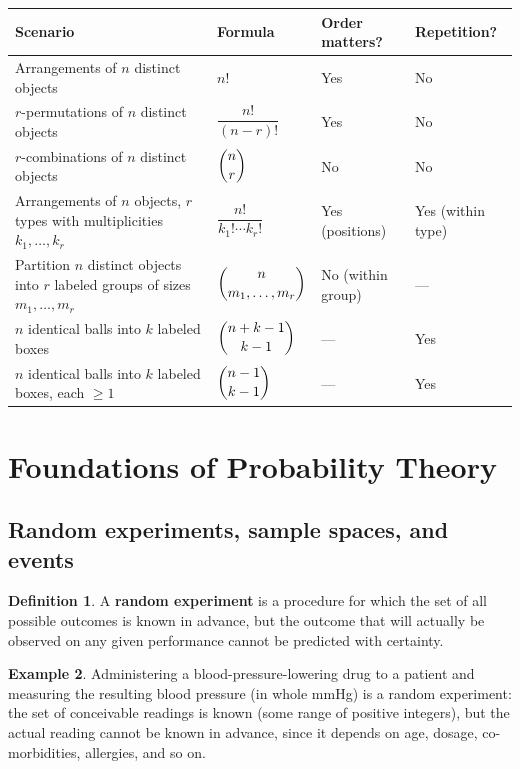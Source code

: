 \documentclass[11pt]{article}
\theoremstyle{definition}
\newtheorem{definition}{Definition}[section]
\newtheorem{example}[definition]{Example}
\theoremstyle{plain}
\theoremstyle{remark}
\begin{document}
\begin{center}
\renewcommand{\arraystretch}{1.5}
\begin{longtable}{p{4.3cm} p{3.7cm} p{2.2cm} p{4.3cm}}
\toprule
\textbf{Scenario} & \textbf{Formula} & \textbf{Order matters?} & \textbf{Repetition?} \\
\midrule
Arrangements of $n$ distinct objects & $n!$ & Yes & No \\
$r$-permutations of $n$ distinct objects & $\dfrac{n!}{(n-r)!}$ & Yes & No \\
$r$-combinations of $n$ distinct objects & $\dbinom{n}{r}$ & No & No \\
Arrangements of $n$ objects, $r$ types with multiplicities $k_1,\dots,k_r$ & $\dfrac{n!}{k_1!\cdots k_r!}$ & Yes (positions) & Yes (within type) \\
Partition $n$ distinct objects into $r$ labeled groups of sizes $m_1,\dots,m_r$ & $\dbinom{n}{m_1,\dots,m_r}$ & No (within group) & --- \\
$n$ identical balls into $k$ labeled boxes & $\dbinom{n+k-1}{k-1}$ & --- & Yes \\
$n$ identical balls into $k$ labeled boxes, each $\ge 1$ & $\dbinom{n-1}{k-1}$ & --- & Yes \\
\bottomrule
\end{longtable}
\end{center}

\newpage
\section{Foundations of Probability Theory}

\subsection{Random experiments, sample spaces, and events}

\begin{definition}
A \textbf{random experiment} is a procedure for which the set of all possible outcomes is known
in advance, but the outcome that will actually be observed on any given performance cannot be
predicted with certainty.
\end{definition}

\begin{example}
Administering a blood-pressure-lowering drug to a patient and measuring the resulting blood
pressure (in whole mmHg) is a random experiment: the set of conceivable readings is known (some
range of positive integers), but the actual reading cannot be known in advance, since it depends
on age, dosage, co-morbidities, allergies, and so on.
\end{example}
\end{document}

